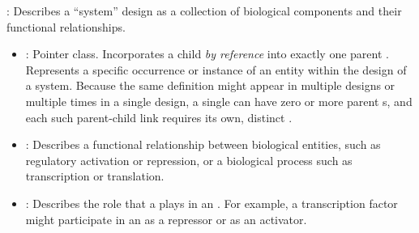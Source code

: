 \begin{description}
\item \emph{}:
Describes a ``system'' design as a collection of biological components and their functional relationships.

\begin{itemize}
\item \emph{}:
Pointer class. Incorporates a child  \textit{by reference} into exactly one parent . Represents a specific occurrence or instance of an entity within the design of a system. Because the same definition might appear in multiple designs or multiple times in a single design, a single  can have zero or more parent s, and each such parent-child link requires its own, distinct .

\item \emph{}:
Describes a functional relationship between biological entities, such as regulatory activation or repression, or a biological process such as transcription or translation.

%

\item \emph{}:
Describes the role that a  plays in an .
For example, a transcription factor might participate in an  as a repressor or as an activator.

\end{itemize}


\end{description}